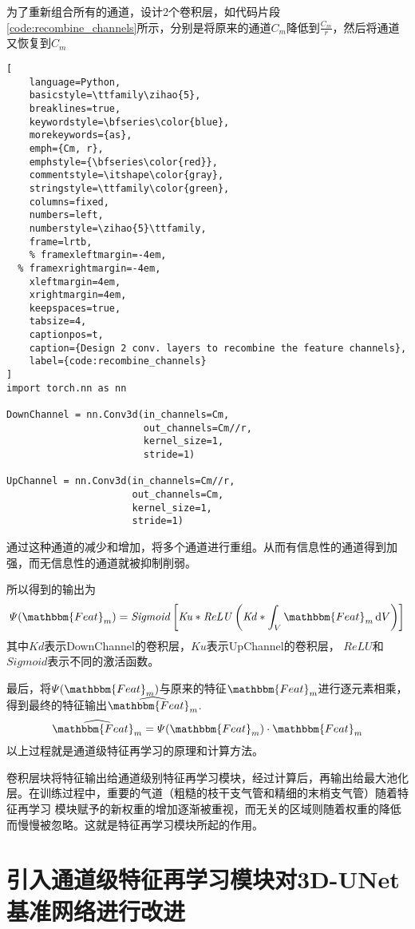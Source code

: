 为了重新组合所有的通道，设计2个卷积层，如代码片段\ref{code:recombine_channels}所示，分别是将原来的通道$C_m$降低到$\frac{C_m}{r}$，然后将通道又恢复到$C_m$
\newpage
\begin{lstlisting}[
	language=Python,
	basicstyle=\ttfamily\zihao{5},
	breaklines=true,
	keywordstyle=\bfseries\color{blue},
	morekeywords={as},
	emph={Cm, r},
	emphstyle={\bfseries\color{red}},
	commentstyle=\itshape\color{gray},
	stringstyle=\ttfamily\color{green},
	columns=fixed,
	numbers=left,
	numberstyle=\zihao{5}\ttfamily,
	frame=lrtb,
	% framexleftmargin=-4em,
  %	framexrightmargin=-4em,
	xleftmargin=4em,
	xrightmargin=4em,
	keepspaces=true,
	tabsize=4,
	captionpos=t,
	caption={Design 2 conv. layers to recombine the feature channels},
	label={code:recombine_channels}
]
import torch.nn as nn

DownChannel = nn.Conv3d(in_channels=Cm, 
                        out_channels=Cm//r, 
                        kernel_size=1, 
                        stride=1)
										 
UpChannel = nn.Conv3d(in_channels=Cm//r, 
                      out_channels=Cm, 
                      kernel_size=1, 
                      stride=1)
\end{lstlisting}
通过这种通道的减少和增加，将多个通道进行重组。从而有信息性的通道得到加强，而无信息性的通道就被抑制削弱。

所以得到的输出为
\begin{equation}
    \varPsi(\mathbbm{Feat}_m) = \mathit{Sigmoid}\left[\mathit{Ku} * \mathit{ReLU}\left(\mathit{Kd} * \int_{V}\mathbbm{Feat}_m \dd V\right)\right]
\end{equation}
其中$Kd$表示DownChannel的卷积层，$Ku$表示UpChannel的卷积层， $ReLU$和$Sigmoid$表示不同的激活函数。

最后，将$\varPsi(\mathbbm{Feat}_m)$与原来的特征$\mathbbm{Feat}_m$进行逐元素相乘，得到最终的特征输出$\widehat{\mathbbm{Feat}_m}$.
\begin{equation}\label{eq:features_element_wise_multiply}
    \widehat{\mathbbm{Feat}_m} = \varPsi(\mathbbm{Feat}_m) \cdot \mathbbm{Feat}_m
\end{equation}
以上过程就是通道级特征再学习的原理和计算方法。

卷积层块将特征输出给通道级别特征再学习模块，经过计算后，再输出给最大池化层。在训练过程中，重要的气道（粗糙的枝干支气管和精细的末梢支气管）随着特征再学习
模块赋予的新权重的增加逐渐被重视，而无关的区域则随着权重的降低而慢慢被忽略。这就是特征再学习模块所起的作用。

\section{引入通道级特征再学习模块对3D-UNet基准网络进行改进}

